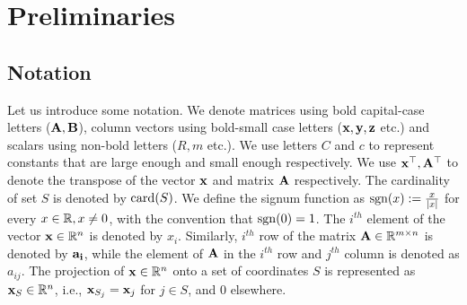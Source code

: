 \section{Preliminaries}
\label{sec:prelim}
\subsection{Notation}
\label{subsec:nota}
Let us introduce some notation. We denote matrices using bold capital-case letters ($\mathbf{A,B}$), column vectors using bold-small case letters ($\mathbf{x,y,z}$ etc.) and scalars using non-bold letters ($R,m$ etc.). We use letters $C$ and $c$ to represent constants that are large enough and small enough respectively. We use $\mathbf{x}^\top,\mathbf{A}^\top$ to denote the transpose of the vector $\mathbf{x}$ and matrix $\mathbf{A}$ respectively. The cardinality of set $S$ is denoted by $\mathrm{card}(S)$.
We define the signum function as $\mathrm{sgn}(x) := \frac{x}{|x|}$ for every $x \in {\mathbb{R}}, x \neq 0$, with the convention that $\mathrm{sgn}(0)=1$. The $i^{th}$ element of the vector $\mathbf{x} \in {\mathbb{R}}^n$ is denoted by $x_{i}$. Similarly, $i^{th}$ row of the matrix $\mathbf{A} \in {\mathbb{R}}^{m \times n}$ is denoted by $\mathbf{a_i}$, while the element of $\mathbf{A}$ in the $i^{th}$ row and $j^{th}$ column is denoted as $a_{ij}$. The projection of $\mathbf{x} \in {\mathbb{R}}^n$ onto a set of coordinates $S$ is represented as $\mathbf{x}_S \in {\mathbb{R}}^n$, i.e., $\mathbf{x}_{S_j} = \mathbf{x}_j$ for $j \in S$, and $0$ elsewhere. 


